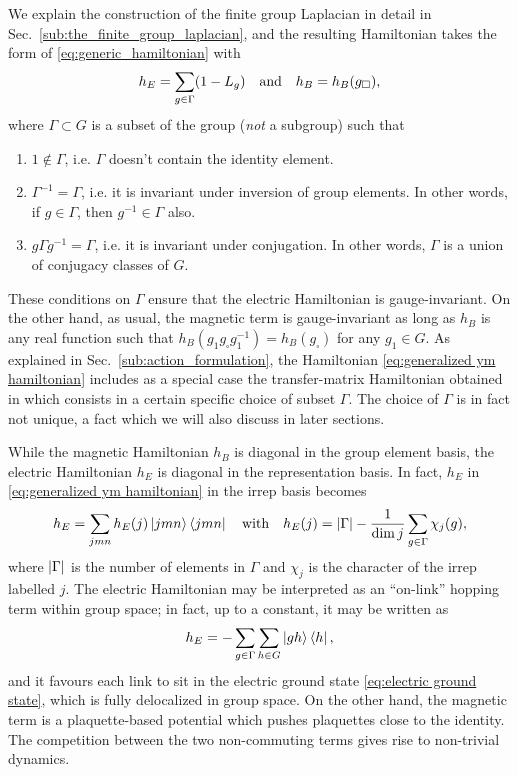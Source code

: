We explain the construction of the finite group Laplacian in detail in Sec.~\ref{sub:the_finite_group_laplacian}, and the resulting Hamiltonian takes the form of \eqref{eq:generic_hamiltonian} with
\begin{equation}
    h_E = \sum_{g \in \Gamma} (1-L_g)
    \qand
    h_B= h_B (g_\square),
    \label{eq:generalized ym hamiltonian}
\end{equation}
where $\Gamma \subset G$ is a subset of the group (\emph{not} a subgroup) such that
\begin{enumerate}
    \item $1 \not \in \Gamma$, i.e.
        $\Gamma$ doesn't contain the identity element.
    \item $\Gamma^{-1}=\Gamma$, i.e.
        it is invariant under inversion of group elements.
        In other words, if $g \in \Gamma$, then $g^{-1} \in \Gamma$ also.
    \item $g \Gamma g^{-1} = \Gamma$, i.e.
        it is invariant under conjugation.
        In other words, $\Gamma$ is a union of conjugacy classes of $G$.
\end{enumerate}
These conditions on $\Gamma$ ensure that the electric Hamiltonian is gauge-invariant.
On the other hand, as usual, the magnetic term is gauge-invariant as long as $h_B$ is any real function such that $h_B(g_1 g_\square g_1^{-1})=h_B(g_\square)$ for any $g_1 \in G$.
As explained in Sec.~\ref{sub:action_formulation}, the Hamiltonian \eqref{eq:generalized ym hamiltonian} includes as a special case the transfer-matrix Hamiltonian obtained in \cite{harlow2018quantum} which consists in a certain specific choice of subset $\Gamma$.
The choice of $\Gamma$ is in fact not unique, a fact which we will also discuss in later sections.

\medskip

While the magnetic Hamiltonian $h_B$ is diagonal in the group element basis, the electric Hamiltonian $h_E$ is diagonal in the representation basis.
In fact, $h_E$ in \eqref{eq:generalized ym hamiltonian} in the \ac{irrep} basis becomes
\begin{equation}
    \label{eq:electric hamiltonian rep basis}
    h_E = \sum_{jmn} h_E(j) \ket{jmn}\bra{jmn}
    \quad \text{with} \quad
    h_E(j)=\abs{\Gamma} - \frac{1}{\dim{j}} \sum_{g \in \Gamma} \chi_j(g),
\end{equation}
where $\abs{\Gamma}$ is the number of elements in $\Gamma$ and $\chi_j$ is the character of the \ac{irrep} labelled $j$.
The electric Hamiltonian may be interpreted as an ``on-link'' hopping term within group space; in fact, up to a constant, it may be written as
\begin{equation}
    h_E = -\sum_{g \in \Gamma} \sum_{h \in G} \ket{gh}\bra{h},
\end{equation}
 and it favours each link to sit in the electric ground state \eqref{eq:electric ground state}, which is fully delocalized in group space.
On the other hand, the magnetic term is a plaquette-based potential which pushes plaquettes close to the identity.
The competition between the two non-commuting terms gives rise to non-trivial dynamics.

